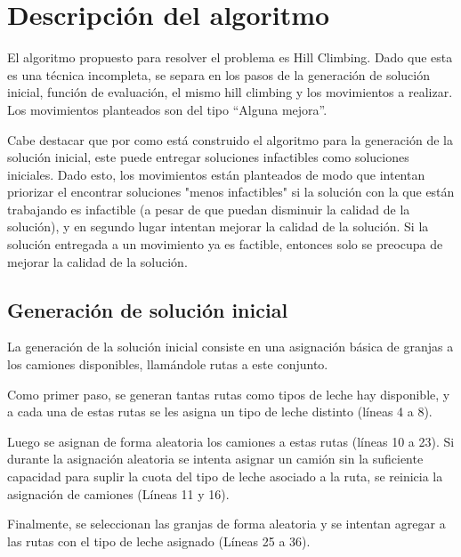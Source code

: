 \section{Descripción del algoritmo}

El algoritmo propuesto para resolver el problema es Hill Climbing. Dado que esta es una técnica incompleta, se separa en los pasos de la generación de solución inicial, función de evaluación, el mismo hill climbing y los movimientos a realizar. Los movimientos planteados son del tipo ``Alguna mejora''.

Cabe destacar que por como está construido el algoritmo para la generación de la solución inicial, este puede entregar soluciones infactibles como soluciones iniciales. Dado esto, los movimientos están planteados de modo que intentan priorizar el encontrar soluciones "menos infactibles" si la solución con la que están trabajando es infactible (a pesar de que puedan disminuir la calidad de la solución), y en segundo lugar intentan mejorar la calidad de la solución. Si la solución entregada a un movimiento ya es factible, entonces solo se preocupa de mejorar la calidad de la solución.

\subsection{Generación de solución inicial}

La generación de la solución inicial consiste en una asignación básica de granjas a los camiones disponibles, llamándole rutas a este conjunto. 

Como primer paso, se generan tantas rutas como tipos de leche hay disponible, y a cada una de estas rutas se les asigna un tipo de leche distinto (líneas 4 a 8).

Luego se asignan de forma aleatoria los camiones a estas rutas (líneas 10 a 23). Si durante la asignación aleatoria se intenta asignar un camión sin la suficiente capacidad para suplir la cuota del tipo de leche asociado a la ruta, se reinicia la asignación de camiones (Líneas 11 y 16).

Finalmente, se seleccionan las granjas de forma aleatoria y se intentan agregar a las rutas con el tipo de leche asignado (Líneas 25 a 36).

